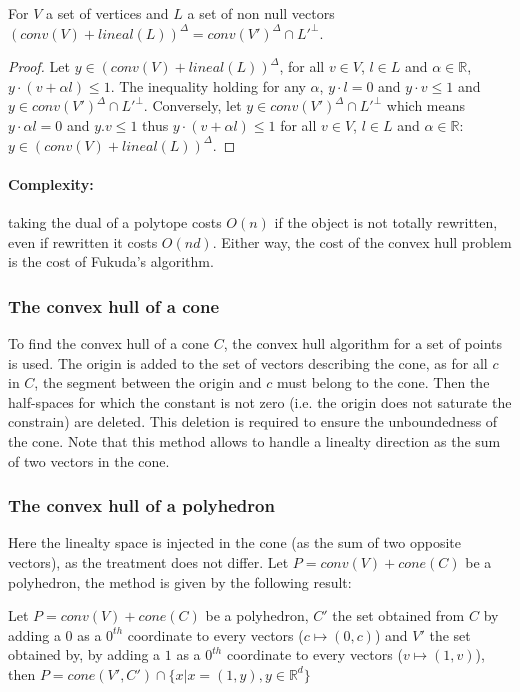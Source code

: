 \begin{proposition}
For $V$ a set of vertices and $L$ a set of non null vectors $(conv(V)+lineal(L))^\Delta = conv(V')^\Delta \cap L'^\bot$. 
\label{prop_lineal_dual}
\end{proposition}
\begin{proof}
Let $y\in (conv(V)+lineal(L))^\Delta$, for all $v\in V$, $l \in L$ and $\alpha\in\mathbb{R}$, $y\cdot (v+\alpha l)\leq 1$. The inequality holding for any $\alpha$,  $y\cdot l=0$ and $y\cdot v\leq 1$ and $y\in conv(V')^\Delta \cap L'^\bot$. Conversely, let $y \in conv(V')^\Delta \cap L'^\bot$ which means $y\cdot \alpha l=0$ and $y.v\leq 1$ thus $y\cdot (v+\alpha l)\leq 1$ for all $v\in V$, $l \in L$ and $\alpha\in\mathbb{R}$: $y\in (conv(V)+lineal(L))^\Delta$.
\end{proof}

\paragraph{Complexity:} taking the dual of a polytope costs $O(n)$ if the object is not totally rewritten, even if rewritten it costs $O(nd)$. Either way, the cost of the convex hull problem is the cost of Fukuda's algorithm.

\subsubsection{The convex hull of a cone}\label{ss_conehull}
To find the convex hull of a cone $C$, the convex hull algorithm for a set of points is used.
The origin is added to the set of vectors describing the cone, as for all $c$ in $C$, the segment between the origin and $c$ must belong to the cone. Then the half-spaces for which  the constant is not zero (i.e. the origin does not saturate the constrain) are deleted. This deletion is required to ensure the unboundedness of the cone. Note that this method allows to handle a linealty direction as the sum of two vectors in the cone.

\subsubsection{The convex hull of a polyhedron}
Here the linealty space is injected in the cone (as the sum of two opposite vectors), as the treatment does not differ. Let $P=conv(V) + cone(C)$ be a polyhedron, the method is given by the following result:
\begin{proposition}
Let $P=conv(V) + cone(C)$ be a polyhedron, $C'$ the set obtained from $C$ by adding a $0$ as a $0^{th}$ coordinate to every vectors ($c \mapsto (0,c)$) and $V'$ the set obtained by, by adding a $1$ as a $0^{th}$ coordinate to every vectors ($v \mapsto (1,v)$), then $P=cone(V',C')\cap \{ x| x= (1,y), y\in \mathbb{R}^d \}$
\end{proposition}

